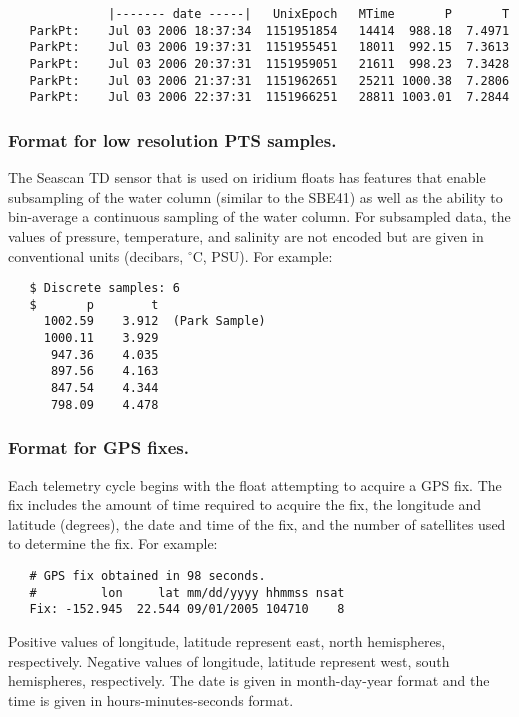    \begin{verbatim}
              |------- date -----|   UnixEpoch   MTime       P       T
   ParkPt:    Jul 03 2006 18:37:34  1151951854   14414  988.18  7.4971
   ParkPt:    Jul 03 2006 19:37:31  1151955451   18011  992.15  7.3613
   ParkPt:    Jul 03 2006 20:37:31  1151959051   21611  998.23  7.3428
   ParkPt:    Jul 03 2006 21:37:31  1151962651   25211 1000.38  7.2806
   ParkPt:    Jul 03 2006 22:37:31  1151966251   28811 1003.01  7.2844
   \end{verbatim}


\subsubsection{Format for low resolution PTS samples.}
\label{sec:LowResPtsSample}
   
   The Seascan TD sensor that is used on iridium floats has features that enable
   subsampling of the water column (similar to the SBE41) as well as the
   ability to bin-average a continuous sampling of the water column.  For
   subsampled data, the values of pressure, temperature, and salinity are not
   encoded but are given in conventional units (decibars, $^\circ$C, PSU).  For
   example:
      
   \begin{verbatim}
   $ Discrete samples: 6
   $       p        t  
     1002.59    3.912  (Park Sample)
     1000.11    3.929  
      947.36    4.035  
      897.56    4.163  
      847.54    4.344  
      798.09    4.478  
    \end{verbatim}

\subsubsection{Format for GPS fixes.}
   
   Each telemetry cycle begins with the float attempting to acquire a GPS
   fix.  The fix includes the amount of time required to acquire the fix,
   the longitude and latitude (degrees), the date and time of the fix, and the
   number of satellites used to determine the fix.  For example:

   \begin{verbatim}
   # GPS fix obtained in 98 seconds.
   #         lon     lat mm/dd/yyyy hhmmss nsat
   Fix: -152.945  22.544 09/01/2005 104710    8
   \end{verbatim}

   Positive values of longitude, latitude represent east, north hemispheres,
   respectively. Negative values of longitude, latitude represent west,
   south hemispheres, respectively.  The date is given in month-day-year
   format and the time is given in hours-minutes-seconds format.

